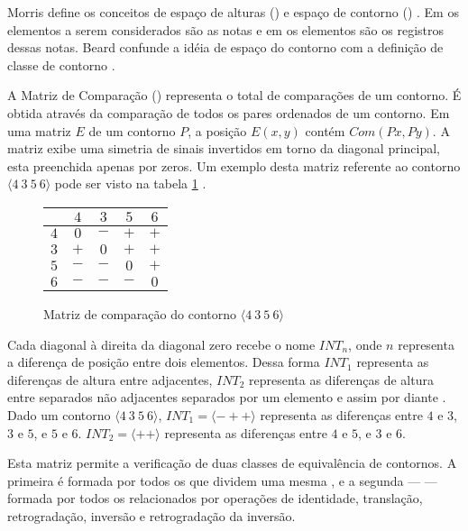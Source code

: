 Morris define os conceitos de espaço de alturas () e
espaço de contorno () \cite{morris87:composition}. Em
 os elementos a serem considerados são as notas e em
 os elementos são os registros dessas notas. Beard
confunde a idéia de espaço do contorno com a definição de classe de
contorno \cite[p. 11]{beard03:contour}.

A Matriz de Comparação () representa o total de
comparações de um contorno. É obtida através da comparação de todos os
pares ordenados de um contorno. Em uma matriz $E$ de um contorno $P$,
a posição $E (x,y)$ contém $Com (Px,Py)$. A matriz exibe uma simetria
de sinais invertidos em torno da diagonal principal, esta preenchida
apenas por zeros. Um exemplo desta matriz referente ao contorno
$\langle 4\:3\:5\:6 \rangle$ pode ser visto na tabela
\ref{fig:matriz-4356} \cite[p. 28]{morris87:composition}.

\begin{figure}
  \centering
  \begin{tabular}{r|cccc}
    & $4$ & $3$ & $5$ & $6$ \\
    \hline
    $4$ & $0$ & $-$ & $+$ & $+$ \\
    $3$ & $+$ & $0$ & $+$ & $+$ \\
    $5$ & $-$ & $-$ & $0$ & $+$ \\
    $6$ & $-$ & $-$ & $-$ & $0$ \\
  \end{tabular}
  \caption{Matriz de comparação do contorno $\langle 4\:3\:5\:6 \rangle$}
  \label{fig:matriz-4356}
\end{figure}

Cada diagonal à direita da diagonal zero recebe o nome $INT_n$, onde
$n$ representa a diferença de posição entre dois elementos. Dessa
forma $INT_1$ representa as diferenças de altura entre 
adjacentes, $INT_2$ representa as diferenças de altura entre
 separados não adjacentes separados por um elemento e
assim por diante \cite[p. 231]{marvin.ea87:relating}. Dado um contorno
$\langle 4\:3\:5\:6 \rangle$, $INT_1 = \langle - + +\rangle$
representa as diferenças entre $4$ e $3$, $3$ e $5$, e $5$ e
$6$. $INT_2 = \langle + + \rangle$ representa as diferenças entre $4$
e $5$, e $3$ e $6$.

Esta matriz permite a verificação de duas classes de equivalência de
contornos. A primeira é formada por todos os  que dividem
uma mesma , e a segunda ---
 --- formada por todos os  relacionados
por operações de identidade, translação, retrogradação, inversão e
retrogradação da inversão.

